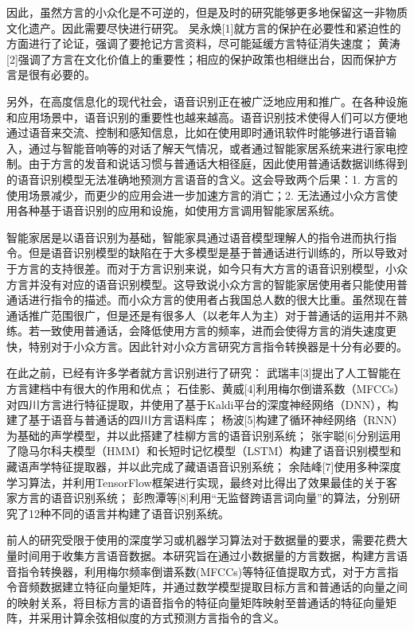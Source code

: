 \documentclass[lang=cn,cite=super]{elegantpaper}
\begin{document}
因此，虽然方言的小众化是不可逆的，但是及时的研究能够更多地保留这一非物质文化遗产。因此需要尽快进行研究。
吴永焕[1]就方言的保护在必要性和紧迫性的方面进行了论证，强调了要抢记方言资料，尽可能延缓方言特征消失速度；
黄涛[2]强调了方言在文化价值上的重要性；相应的保护政策也相继出台，因而保护方言是很有必要的。

另外，在高度信息化的现代社会，语音识别正在被广泛地应用和推广。在各种设施和应用场景中，语音识别的重要性也越来越高。语音识别技术使得人们可以方便地通过语音来交流、控制和感知信息，比如在使用即时通讯软件时能够进行语音输入，通过与智能音响等的对话了解天气情况，或者通过智能家居系统来进行家电控制。由于方言的发音和说话习惯与普通话大相径庭，因此使用普通话数据训练得到的语音识别模型无法准确地预测方言语音的含义。这会导致两个后果：1. 方言的使用场景减少，而更少的应用会进一步加速方言的消亡；2. 无法通过小众方言使用各种基于语音识别的应用和设施，如使用方言调用智能家居系统。

智能家居是以语音识别为基础，智能家具通过语音模型理解人的指令进而执行指令。但是语音识别模型的缺陷在于大多模型是基于普通话进行训练的，所以导致对于方言的支持很差。而对于方言识别来说，如今只有大方言的语音识别模型，小众方言并没有对应的语音识别模型。这导致说小众方言的智能家居使用者只能使用普通话进行指令的描述。而小众方言的使用者占我国总人数的很大比重。虽然现在普通话推广范围很广，但是还是有很多人（以老年人为主）对于普通话的运用并不熟练。若一致使用普通话，会降低使用方言的频率，进而会使得方言的消失速度更快，特别对于小众方言。因此针对小众方言研究方言指令转换器是十分有必要的。

在此之前，已经有许多学者就方言识别进行了研究：
武瑞丰[3]提出了人工智能在方言建档中有很大的作用和优点；
石佳影、黄威[4]利用梅尔倒谱系数（MFCCs）对四川方言进行特征提取，并使用了基于Kaldi平台的深度神经网络（DNN），构建了基于语音与普通话的四川方言语料库；
杨波[5]构建了循环神经网络（RNN）为基础的声学模型，并以此搭建了桂柳方言的语音识别系统；
张宇聪[6]分别运用了隐马尔科夫模型（HMM）和长短时记忆模型（LSTM）构建了语音识别模型和藏语声学特征提取器，并以此完成了藏语语音识别系统；
余陆峰[7]使用多种深度学习算法，并利用TensorFlow框架进行实现，最终对比得出了效果最佳的关于客家方言的语音识别系统；
彭煦潭等[8]利用“无监督跨语言词向量”的算法，分别研究了12种不同的语言并构建了语音识别系统。

前人的研究受限于使用的深度学习或机器学习算法对于数据量的要求，需要花费大量时间用于收集方言语音数据。本研究旨在通过小数据量的方言数据，构建方言语音指令转换器，利用梅尔频率倒谱系数(MFCCs)等特征值提取方式，对于方言指令音频数据建立特征向量矩阵，并通过数学模型提取目标方言和普通话的向量之间的映射关系，将目标方言的语音指令的特征向量矩阵映射至普通话的特征向量矩阵，并采用计算余弦相似度的方式预测方言指令的含义。
\end{document}
